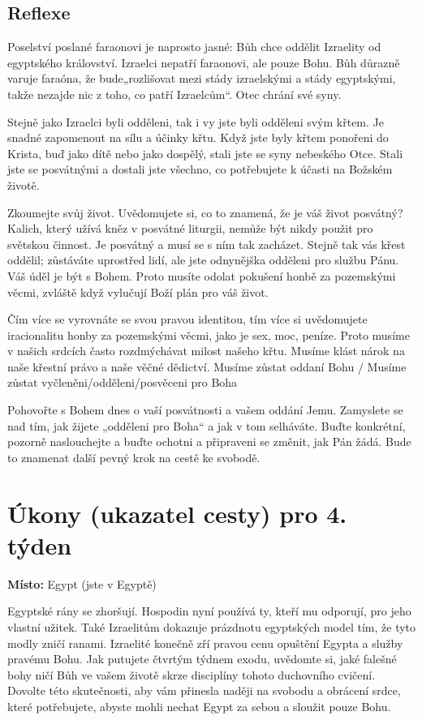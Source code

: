 \documentclass[11pt]{article}
\begin{document}
\subsection*{Reflexe}

Poselství poslané faraonovi je naprosto jasné: Bůh chce oddělit Izraelity od egyptského království. Izraelci nepatří
faraonovi, ale pouze Bohu. Bůh důrazně varuje faraóna, že bude„rozlišovat mezi stády izraelskými a stády
egyptskými, takže nezajde nic z toho, co patří Izraelcům“. Otec chrání své syny.

Stejně jako Izraelci byli odděleni, tak i vy jste byli odděleni svým křtem. Je snadné zapomenout na sílu a účinky
křtu. Když jste byly křtem ponořeni do Krista, buď jako dítě nebo jako dospělý, stali jste se syny nebeského Otce.
Stali jste se posvátnými a dostali jste všechno, co potřebujete k účasti na Božském životě.

Zkoumejte svůj život. Uvědomujete si, co to znamená, že je váš život posvátný? Kalich, který užívá kněz v
posvátné liturgii, nemůže být nikdy použit pro světskou činnost. Je posvátný a musí se s ním tak zacházet. Stejně
tak vás křest oddělil; zůstáváte uprostřed lidí, ale jste odnynějška odděleni pro službu Pánu. Váš úděl je být s
Bohem. Proto musíte odolat pokušení honbě za pozemskými věcmi, zvláště když vylučují Boží plán pro váš život.

Čím více se vyrovnáte se svou pravou identitou, tím více si uvědomujete iracionalitu honby za pozemskými věcmi,
jako je sex, moc, peníze. Proto musíme v našich srdcích často rozdmýchávat milost našeho křtu. Musíme klást
nárok na naše křestní právo a naše věčné dědictví. Musíme zůstat oddaní Bohu / Musíme zůstat
vyčleněni/odděleni/posvěceni pro Boha

Pohovořte s Bohem dnes o vaší posvátnosti a vašem oddání Jemu. Zamyslete se nad tím, jak žijete „odděleni pro
Boha“ a jak v tom selháváte. Buďte konkrétní, pozorně naslouchejte a buďte ochotni a připraveni se změnit, jak
Pán žádá. Bude to znamenat další pevný krok na cestě ke svobodě.

\newpage
\section*{Úkony (ukazatel cesty) pro 4. týden}

\textbf{Místo:} Egypt (jste v Egyptě)

Egyptské rány se zhoršují. Hospodin nyní používá ty, kteří mu odporují, pro jeho vlastní užitek. Také
Izraelitům dokazuje prázdnotu egyptských model tím, že tyto modly zničí ranami. Izraelité konečně zří
pravou cenu opuštění Egypta a služby pravému Bohu. Jak putujete čtvrtým týdnem exodu, uvědomte si,
jaké falešné bohy ničí Bůh ve vašem životě skrze disciplíny tohoto duchovního cvičení. Dovolte této
skutečnosti, aby vám přinesla naději na svobodu a obrácení srdce, které potřebujete, abyste mohli nechat
Egypt za sebou a sloužit pouze Bohu.
\end{document}
